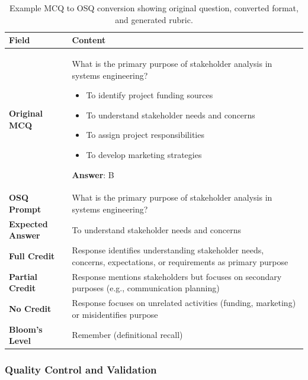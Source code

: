 \begin{table}[htbp]
    \centering
    \caption{Example MCQ to OSQ conversion showing original question, converted format, and generated rubric.}
    \label{tab:conversion_example}
    \small
    \begin{tabular}{p{3cm}p{10cm}}
        \toprule
        \textbf{Field} & \textbf{Content} \\
        \midrule
        \textbf{Original MCQ} &
        \begin{minipage}[t]{10cm}
        What is the primary purpose of stakeholder analysis in systems engineering?
        \begin{itemize}[noitemsep,topsep=0pt]
            \item[A.] To identify project funding sources
            \item[B.] To understand stakeholder needs and concerns
            \item[C.] To assign project responsibilities
            \item[D.] To develop marketing strategies
        \end{itemize}
        \textbf{Answer}: B
        \end{minipage} \\
        \addlinespace
        \textbf{OSQ Prompt} & What is the primary purpose of stakeholder analysis in systems engineering? \\
        \addlinespace
        \textbf{Expected Answer} & To understand stakeholder needs and concerns \\
        \addlinespace
        \textbf{Full Credit} & Response identifies understanding stakeholder needs, concerns, expectations, or requirements as primary purpose \\
        \addlinespace
        \textbf{Partial Credit} & Response mentions stakeholders but focuses on secondary purposes (e.g., communication planning) \\
        \addlinespace
        \textbf{No Credit} & Response focuses on unrelated activities (funding, marketing) or misidentifies purpose \\
        \addlinespace
        \textbf{Bloom's Level} & Remember (definitional recall) \\
        \bottomrule
    \end{tabular}
\end{table}

\subsubsection{Quality Control and Validation}


